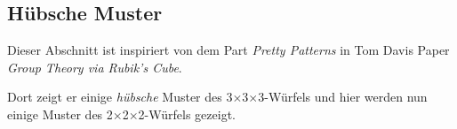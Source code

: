 \documentclass[12pt,a4paper, usenames, dvipsnames]{article}
\newcommand{\Ttwo}{2$\times$2$\times$2-}
\newcommand{\Tthree}{3$\times$3$\times$3-}
\begin{document}
%
%
%
%
%
%
%
%
%
%
%
%
%
%
%
%
%
%
%
\subsection*{Hübsche Muster}
Dieser Abschnitt ist inspiriert von dem Part \textit{Pretty Patterns} in Tom Davis Paper \textit{Group Theory via Rubik's Cube}.

Dort zeigt er einige \textit{hübsche} Muster des \Tthree Würfels und hier werden nun einige Muster des \Ttwo Würfels gezeigt.
%
%
%
%
%
%
%
%
%
%
%
%
%
%
%
%
%
%
%
%
\newpage



\listoffigures

\newpage


\listoftables

\newpage


\printbibliography
\end{document}
